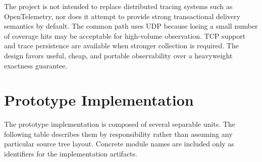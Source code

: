 \documentclass[11pt]{article}
\begin{document}
The project is not intended to replace distributed tracing systems such as
OpenTelemetry, nor does it attempt to provide strong transactional delivery
semantics by default. The common path uses UDP because losing a small number of
coverage hits may be acceptable for high-volume observation. TCP support and
trace persistence are available when stronger collection is required. The
design favors useful, cheap, and portable observability over a heavyweight
exactness guarantee.

\section{Prototype Implementation}

The prototype implementation is composed of several separable units. The
following table describes them by responsibility rather than assuming any
particular source tree layout. Concrete module names are included only as
identifiers for the implementation artifacts.
\end{document}
